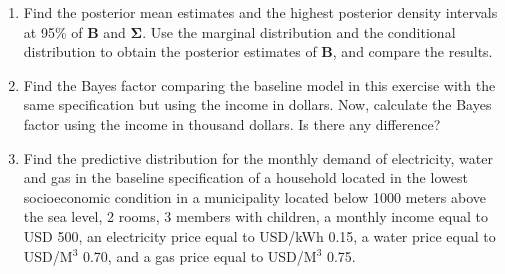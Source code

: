 \begin{enumerate}
\begin{enumerate}
	\item Find the posterior mean estimates and the highest posterior density intervals at 95\% of $\mathbf{B}$ and $\bm{\Sigma}$. Use the marginal distribution and the conditional distribution to obtain the posterior estimates of  $\mathbf{B}$, and compare the results.
	\item Find the Bayes factor comparing the baseline model in this exercise with the same specification but using the income in dollars. Now, calculate the Bayes factor using the income in thousand dollars. Is there any difference?
	\item Find the predictive distribution for the monthly demand of electricity, water and gas in the baseline specification of a household located in the lowest socioeconomic condition in a municipality located below 1000 meters above the sea level, 2 rooms, 3 members with children, a monthly income equal to USD 500, an electricity price equal to USD/kWh 0.15, a water price equal to USD/M$^3$ 0.70, and a gas price equal to USD/M$^3$ 0.75. 
\end{enumerate} 
	

\end{enumerate}



